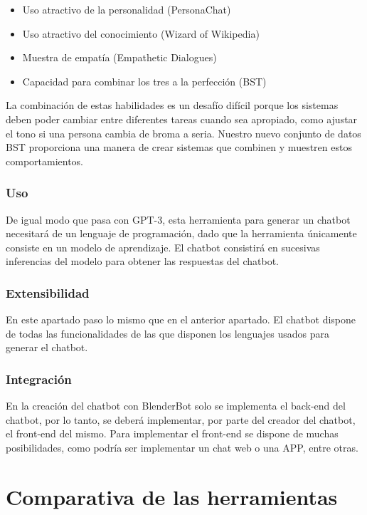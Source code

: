 \begin{itemize}
\item Uso atractivo de la personalidad (PersonaChat)
\item Uso atractivo del conocimiento (Wizard of Wikipedia)
\item Muestra de empatía (Empathetic Dialogues)
\item Capacidad para combinar los tres a la perfección (BST)
\end{itemize}

La combinación de estas habilidades es un desafío difícil porque los sistemas deben poder cambiar entre diferentes tareas cuando sea apropiado, como ajustar el tono si una persona cambia de broma a seria. Nuestro nuevo conjunto de datos BST proporciona una manera de crear sistemas que combinen y muestren estos comportamientos.

\subsubsection*{Uso}

De igual modo que pasa con GPT-3, esta herramienta para generar un chatbot necesitará de un lenguaje de programación, dado que la herramienta únicamente consiste en un modelo de aprendizaje. El chatbot consistirá en sucesivas inferencias del modelo para obtener las respuestas del chatbot.

\subsubsection*{Extensibilidad}

En este apartado paso lo mismo que en el anterior apartado. El chatbot dispone de todas las funcionalidades de las que disponen los lenguajes usados para generar el chatbot.

\subsubsection*{Integración}

En la creación del chatbot con BlenderBot solo se implementa el \gls{back-end} del chatbot, por lo tanto, se deberá implementar, por parte del creador del chatbot, el \gls{front-end} del mismo. Para implementar el \gls{front-end} se dispone de muchas posibilidades, como podría ser implementar un chat web o una APP, entre otras.




\section{Comparativa de las herramientas}

